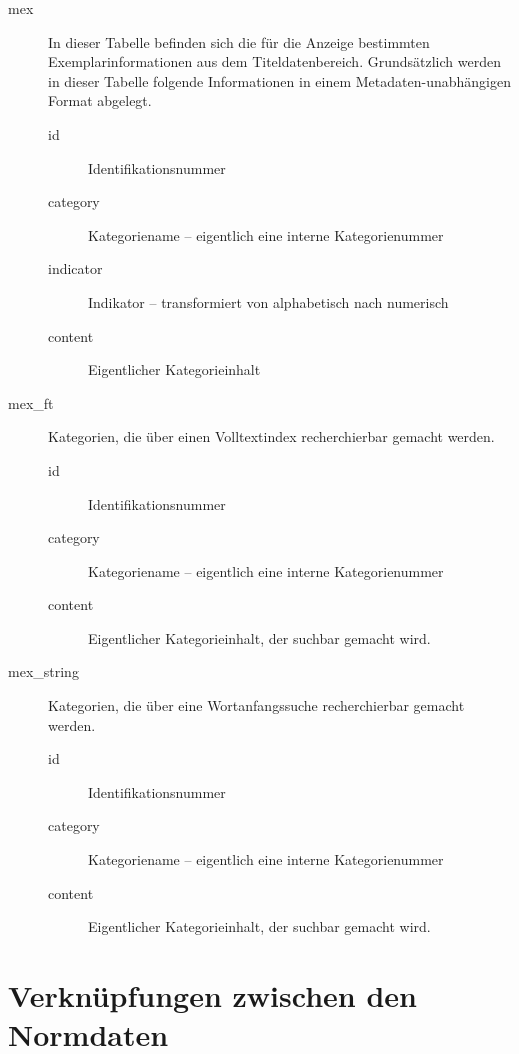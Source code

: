 \documentclass[11pt, twoside, a4paper, BCOR8mm, DIV12, bibtotoc,idxtotoc]{scrbook}
\begin{document}
\begin{description}
\item[mex] In dieser Tabelle befinden sich die für die Anzeige
  bestimmten Exemplarinformationen aus dem Titeldatenbereich.
  Grundsätzlich werden in dieser Tabelle folgende Informationen in
  einem Metadaten-unabhängigen Format abgelegt.
  \begin{description}
  \item[id] Identifikationsnummer
  \item[category] Kategoriename -- eigentlich eine interne Kategorienummer
  \item[indicator] Indikator -- transformiert von alphabetisch nach numerisch
  \item[content] Eigentlicher Kategorieinhalt
  \end{description}
\item[mex\_ft] Kategorien, die über einen Volltextindex recherchierbar
  gemacht werden.
  \begin{description}
  \item[id] Identifikationsnummer
  \item[category] Kategoriename -- eigentlich eine interne Kategorienummer
  \item[content] Eigentlicher Kategorieinhalt, der suchbar gemacht wird.
  \end{description}
\item[mex\_string] Kategorien, die über eine Wortanfangssuche
  recherchierbar gemacht werden.
  \begin{description}
  \item[id] Identifikationsnummer
  \item[category] Kategoriename -- eigentlich eine interne Kategorienummer
  \item[content] Eigentlicher Kategorieinhalt, der suchbar gemacht wird.
  \end{description}
\end{description}

\section{Verknüpfungen zwischen den Normdaten}
\end{document}
